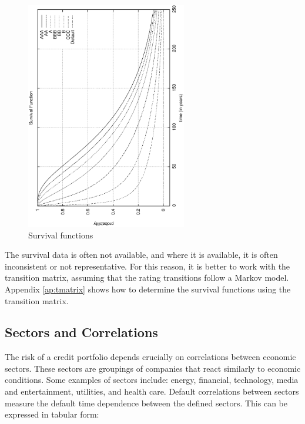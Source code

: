 \documentclass[a4paper,12pt,final]{article}
\begin{document}
\begin{figure}[!hbt]
\begin{center}
\includegraphics[height=10cm, angle=-90]{./images/survival.ps}
\caption{Survival functions}
\label{survival}
\end{center}
\end{figure}
\FloatBarrier

The survival data is often not available, and where it is available, it is 
often inconsistent or not representative. For this reason, it is better to work 
with the transition matrix, assuming that the rating transitions follow a Markov 
model. Appendix \ref{ap:tmatrix} shows how to determine the survival functions 
using the transition matrix.

\subsection{Sectors and Correlations}
\label{sectors}
The risk of a credit portfolio depends crucially on correlations between 
economic sectors. These sectors are groupings of companies that react similarly to 
economic conditions. Some examples of sectors include: energy, financial, technology, 
media and entertainment, utilities, and health care. Default correlations between 
sectors measure the default time dependence between the defined sectors. This 
can be expressed in tabular form:
\end{document}

